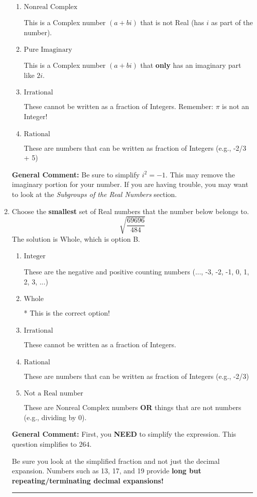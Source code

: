 \documentclass{extbook}[14pt]
\newcommand{\litem}[1]{\item #1

\rule{\textwidth}{0.4pt}}
\begin{document}
\begin{enumerate}
{\begin{enumerate}[label=\Alph*.]
* This is the correct option!
\item \( \text{Nonreal Complex} \)

This is a Complex number $(a+bi)$ that is not Real (has $i$ as part of the number).
\item \( \text{Pure Imaginary} \)

This is a Complex number $(a+bi)$ that \textbf{only} has an imaginary part like $2i$.
\item \( \text{Irrational} \)

These cannot be written as a fraction of Integers. Remember: $\pi$ is not an Integer!
\item \( \text{Rational} \)

These are numbers that can be written as fraction of Integers (e.g., -2/3 + 5)
\end{enumerate}

\textbf{General Comment:} Be sure to simplify $i^2 = -1$. This may remove the imaginary portion for your number. If you are having trouble, you may want to look at the \textit{Subgroups of the Real Numbers} section.
}
\litem{
Choose the \textbf{smallest} set of Real numbers that the number below belongs to.
\[ \sqrt{\frac{69696}{484}} \]The solution is \( \text{Whole} \), which is option B.\begin{enumerate}[label=\Alph*.]
\item \( \text{Integer} \)

These are the negative and positive counting numbers (..., -3, -2, -1, 0, 1, 2, 3, ...)
\item \( \text{Whole} \)

* This is the correct option!
\item \( \text{Irrational} \)

These cannot be written as a fraction of Integers.
\item \( \text{Rational} \)

These are numbers that can be written as fraction of Integers (e.g., -2/3)
\item \( \text{Not a Real number} \)

These are Nonreal Complex numbers \textbf{OR} things that are not numbers (e.g., dividing by 0).
\end{enumerate}

\textbf{General Comment:} First, you \textbf{NEED} to simplify the expression. This question simplifies to $264$. 
 
 Be sure you look at the simplified fraction and not just the decimal expansion. Numbers such as 13, 17, and 19 provide \textbf{long but repeating/terminating decimal expansions!} 
 
}
\end{enumerate}
\end{document}
